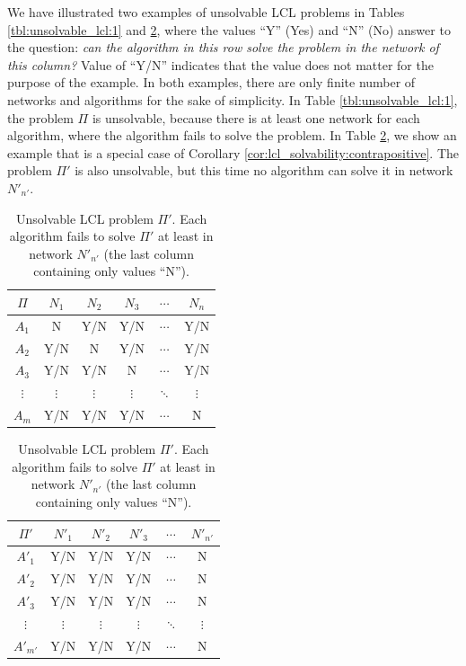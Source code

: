 We have illustrated two examples of unsolvable LCL problems in Tables \ref{tbl:unsolvable_lcl:1} and \ref{tbl:unsolvable_lcl:2}, where the values ``Y'' (Yes) and ``N'' (No) answer to the question: \emph{can the algorithm in this row solve the problem in the network of this column?}
Value of ``Y/N'' indicates that the value does not matter for the purpose of the example.
In both examples, there are only finite number of networks and algorithms for the sake of simplicity.
In Table \ref{tbl:unsolvable_lcl:1}, the problem $\Pi$ is unsolvable, because there is at least one network for each algorithm, where the algorithm fails to solve the problem.
In Table \ref{tbl:unsolvable_lcl:2}, we show an example that is a special case of Corollary \ref{cor:lcl_solvability:contrapositive}.
The problem $\Pi'$ is also unsolvable, but this time no algorithm can solve it in network $N'_{n'}$.

\begin{table}[H]
    \parbox{.45\linewidth}{
    \centering
        \begin{tabular}{c|ccccc}
        $\Pi$&$N_1$&$N_2$&$N_3$&$\cdots$&$N_n$ \\
        \hline
        $A_1$& N & Y/N & Y/N & $\cdots$ &  Y/N  \\
        $A_2$& Y/N & N & Y/N & $\cdots$ &  Y/N  \\
        $A_3$& Y/N & Y/N & N& $\cdots$ &  Y/N  \\
        $\vdots$&$\vdots$&$\vdots$&$\vdots$&$\ddots$&$\vdots$ \\
        $A_{m}$& Y/N & Y/N & Y/N & $\cdots$ &  N \\
        \hline
        \end{tabular}
    \caption{
        Unsolvable LCL problem $\Pi$.
        Each algorithm fails to solve $\Pi$ in at least some network, denoted by ``N'' (No).
    }
    \label{tbl:unsolvable_lcl:1}
    }
    \hfill
    \parbox{.45\linewidth}{
        \centering
        \begin{tabular}{c|ccccc}
        $\Pi'$&$N'_1$&$N'_2$&$N'_3$&$\cdots$&$N'_{n'}$ \\
        \hline
        $A'_1$& Y/N & Y/N & Y/N & $\cdots$ &  N \\
        $A'_2$& Y/N & Y/N & Y/N & $\cdots$ &  N \\
        $A'_3$& Y/N & Y/N & Y/N & $\cdots$ &  N \\
        $\vdots$&$\vdots$&$\vdots$&$\vdots$&$\ddots$&$\vdots$ \\
        $A'_{m'}$& Y/N & Y/N & Y/N & $\cdots$ &  N \\
        \hline
        \end{tabular}
    \caption{
        Unsolvable LCL problem $\Pi'$.
        Each algorithm fails to solve $\Pi'$ at least in network $N'_{n'}$ (the last column containing only values ``N'').
    }
    \label{tbl:unsolvable_lcl:2}
    }
\end{table}

